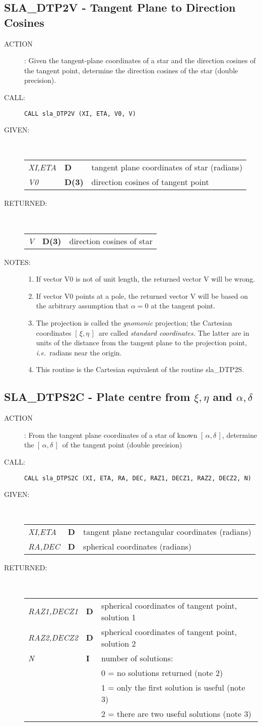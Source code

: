 \documentclass[11pt,twoside]{article}
\newcommand{\xlabel}[1]{}
\newcommand{\radec}     {$[\,\alpha,\delta\,]$}
\newcommand{\xieta}     {$[\,\xi,\eta\,]$}
\newcommand{\routine}[3]
{\hbadness=10000
  \vbox
  {
    \rule{\textwidth}{0.3mm}\\
    {\Large {\bf #1} \hfill #2 \hfill {\bf #1}}\\
    \setlength{\oldspacing}{\topsep}
    \setlength{\topsep}{0.3ex}
    \begin{description}
      #3
    \end{description}
    \setlength{\topsep}{\oldspacing}
  }
}
\renewcommand{\routine}[3]
   {
      \subsection{#1\xlabel{#1} - #2\label{#1}}
       \begin{description}
         #3
       \end{description}
   }
\newcommand{\action}[1]
{\item[ACTION]: #1}
\newcommand{\action}[1]
   {\item[ACTION:] #1}
\newcommand{\call}[1]
{\item[CALL]: \hspace{0.4em}{\tt #1}}
\newlength{\oldspacing}
\renewcommand{\call}[1]
   {
    \item[CALL:] {\tt #1}
   }
\newcommand{\args}[2]
{
  \goodbreak
  \setlength{\oldspacing}{\topsep}
  \setlength{\topsep}{0.3ex}
  \begin{description}
  \item[#1]:\\[1.5ex]
    \begin{tabular}{p{7em}p{6em}p{22em}}
      #2
    \end{tabular}
  \end{description}
  \setlength{\topsep}{\oldspacing}
}
\renewcommand{\args}[2]
   {
     \begin{description}
        \item[#1:]\\
        \begin{tabular}{p{7em}p{6em}l}
           #2
        \end{tabular}
     \end{description}
   }
\newcommand{\spec}[3]
{
  {\em {#1}} & {\bf \mbox{#2}} & {#3}
}
\newcommand{\notes}[1]
{
  \goodbreak
  \setlength{\oldspacing}{\topsep}
  \setlength{\topsep}{0.3ex}
  \begin{description}
    \item[NOTES]:
        #1
  \end{description}
  \setlength{\topsep}{\oldspacing}
}
\renewcommand{\notes}[1]
   {
      \begin{description}
         \item[NOTES:]
            #1
      \end{description}
   }
\begin{document}
\routine{SLA\_DTP2V}{Tangent Plane to Direction Cosines}
{
 \action{Given the tangent-plane coordinates of a star and the direction
         cosines of the tangent point, determine the direction cosines
         of the star
         (double precision).}
 \call{CALL sla\_DTP2V (XI, ETA, V0, V)}
}
\args{GIVEN}
{
 \spec{XI,ETA}{D}{tangent plane coordinates of star (radians)} \\
 \spec{V0}{D(3)}{direction cosines of tangent point}
}
\args{RETURNED}
{
 \spec{V}{D(3)}{direction cosines of star}
}
\notes
{
 \begin{enumerate}
  \item If vector V0 is not of unit length, the returned vector V will
        be wrong.
  \item If vector V0 points at a pole, the returned vector V will be
        based on the arbitrary assumption that $\alpha=0$ at
        the tangent point.
  \item The projection is called the {\it gnomonic}\/ projection;  the
        Cartesian coordinates \xieta\ are called 
        {\it standard coordinates.}\/  The latter
        are in units of the distance from the tangent plane to the projection
        point, {\it i.e.}\ radians near the origin.
  \item This routine is the Cartesian equivalent of the routine sla\_DTP2S.
 \end{enumerate}
}
\routine{SLA\_DTPS2C}{Plate centre from $\xi,\eta$ and $\alpha,\delta$}
{
 \action{From the tangent plane coordinates of a star of known \radec,
        determine the \radec\ of the tangent point (double precision)}
 \call{CALL sla\_DTPS2C (XI, ETA, RA, DEC, RAZ1, DECZ1, RAZ2, DECZ2, N)}
}
\args{GIVEN}
{
 \spec{XI,ETA}{D}{tangent plane rectangular coordinates (radians)} \\
 \spec{RA,DEC}{D}{spherical coordinates (radians)}
}
\args{RETURNED}
{
 \spec{RAZ1,DECZ1}{D}{spherical coordinates of tangent point,
                      solution 1} \\
 \spec{RAZ2,DECZ2}{D}{spherical coordinates of tangent point,
                      solution 2} \\
 \spec{N}{I}{number of solutions:} \\
 \spec{}{}{\hspace{1em} 0 = no solutions returned  (note 2)} \\
 \spec{}{}{\hspace{1em} 1 = only the first solution is useful (note 3)} \\
 \spec{}{}{\hspace{1em} 2 = there are two useful solutions (note 3)}
}
\end{document}

